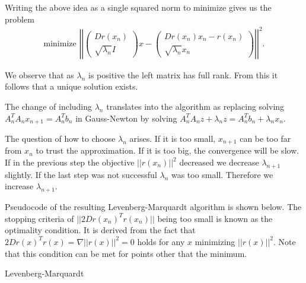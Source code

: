 Writing the above idea as a single squared norm to minimize gives us the problem
\begin{align*}
	\text{minimize }
	\left|\left|\left(\begin{matrix}
		Dr(x_n)\\ \sqrt{\lambda_n}I
	\end{matrix}\right) x - \left(\begin{matrix}
		Dr(x_n)x_n - r(x_n)\\ \sqrt{\lambda_n} x_n
	\end{matrix}\right)\right|\right|^2.
\end{align*}

We observe that as $\lambda_n$ is positive the left matrix has full rank. From this it follows that a unique solution exists.

The change of including $\lambda_n$ translates into the algorithm as replacing solving\\ ${A_n^TA_nx_{n+1} = A_n^Tb_n}$ in Gauss-Newton by solving ${A_n^T A_n z + \lambda_n z= A_n^T b_n + \lambda_n x_n}$.

The question of how to choose $\lambda_n$ arises. If it is too small, $x_{n+1}$ can be too far from $x_n$ to trust the approximation. If it is too big, the convergence will be slow. If in the previous step the objective $||r(x_n)||^2$ decreased we decrease $\lambda_{n+1}$ slightly. If the last step was not successful $\lambda_n$ was too small. Therefore we increase $\lambda_{n+1}$.

Pseudocode of the resulting Levenberg-Marquardt algorithm is shown below. The\\ stopping criteria of $||2Dr(x_n)^Tr(x_n)||$ being too small is known as the optimality condition. It is derived from the fact that $2Dr(x)^Tr(x) = \nabla||r(x)||^2 = 0$ holds for any $x$ minimizing $||r(x)||^2$. Note that this condition can be met for points other that the minimum.

\begin{algorithm}[H] \label{alg:levenberg-marquardt}
	\SetAlgoLined
	\DontPrintSemicolon
	\LinesNumbered
	\caption{Levenberg-Marquardt}
	
	\BlankLine
\end{algorithm}
\vspace{1cm}

